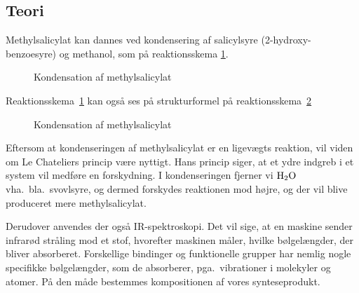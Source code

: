 \subsection*{Teori}\label{Teori}
Methylsalicylat kan dannes ved kondensering af salicylsyre
(2-hydroxy-benzoesyre) og methanol, som på reaktionsskema \ref{fig:rek1}.

\begin{figure}[h]
  \centering
  \caption{Kondensation af methylsalicylat}
  \label{fig:rek1}
\end{figure}

Reaktionsskema~\ref{fig:rek1} kan også ses på strukturformel på
reaktionsskema~\ref{fig:rek2}

\begin{figure}[h]
  \centering
  \caption{Kondensation af methylsalicylat}
  \label{fig:rek2}
\end{figure}

Eftersom at kondenseringen af methylsalicylat er en
ligevægts reaktion, vil viden om Le Chateliers princip være nyttigt.
Hans princip siger, at et ydre indgreb i et system vil medføre
en forskydning. I kondenseringen fjerner vi $\ce{H2O}$ vha.~bla.~svovlsyre,
og dermed forskydes reaktionen mod højre, og der vil blive
produceret mere methylsalicylat.

Derudover anvendes der også IR-spektroskopi. Det vil sige,
at en maskine sender infrarød stråling mod et stof,
hvorefter maskinen måler, hvilke bølgelængder, der bliver
absorberet. Forskellige bindinger og funktionelle grupper har
nemlig nogle specifikke bølgelængder, som de absorberer,
pga.~vibrationer i molekyler og atomer. På den måde bestemmes
kompositionen af vores synteseprodukt.